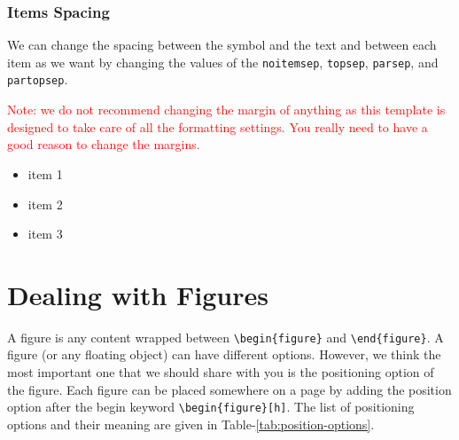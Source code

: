 \subsubsection{Items Spacing}

We can change the spacing between the symbol and the text and between each item as we want by changing the values of the \verb|noitemsep|, \verb|topsep|, \verb|parsep|, and \verb|partopsep|. 

\textcolor{red}{Note: we do not recommend changing the margin of anything as this template is designed to take care of all the formatting settings. You really need to have a good reason to change the margins.}

\begin{itemize}[noitemsep,topsep=10pt,parsep=10pt,partopsep=10pt]
\item item 1
\item item 2
\item item 3
\end{itemize}


\section{Dealing with Figures}
\label{sec:dealing_with_figures}

A figure is any content wrapped between \verb|\begin{figure}| and \verb|\end{figure}|. A figure (or any floating object) can have different options. However, we think the most important one that we should share with you is the positioning option of the figure. Each figure can be placed somewhere on a page by adding the position option after the begin keyword \verb|\begin{figure}[h]|. The list of positioning options and their meaning are given in Table-\ref{tab:position-options}.

